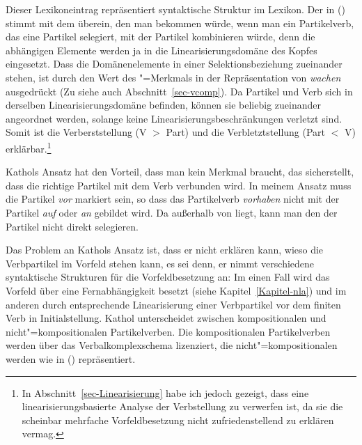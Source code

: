 \noindent
Dieser Lexikoneintrag repräsentiert syntaktische Struktur im Lexikon.
Der \domw in () stimmt mit dem \domw überein, den man bekommen würde,
wenn man ein Partikelverb, das eine Partikel selegiert, mit der Partikel kombinieren
würde, denn die abhängigen Elemente werden ja in die Linearisierungsdomäne
des Kopfes eingesetzt. Dass die Domänenelemente in einer Selektionsbeziehung zueinander stehen,
ist durch den Wert des \vcomp"=Merkmals in der Repräsentation von \emph{wachen} ausgedrückt
(Zu \vcomp siehe auch Abschnitt~\ref{sec-vcomp}).
Da Partikel und Verb sich in derselben Linearisierungsdomäne befinden, können sie beliebig
zueinander angeordnet werden, solange keine Linearisierungsbeschränkungen verletzt sind. Somit
ist die Verberststellung (V $>$ Part) und die Verbletztstellung (Part $<$ V) erklärbar.\footnote{
  In Abschnitt~\ref{sec-Linearisierung} habe ich jedoch gezeigt, dass eine linearisierungsbasierte
  Analyse der Verbstellung zu verwerfen ist, da sie die scheinbar mehrfache Vorfeldbesetzung nicht
  zufriedenstellend zu erklären vermag.%
}

Kathols Ansatz hat den Vorteil, dass man kein Merkmal braucht, das sicherstellt, dass
die richtige Partikel mit dem Verb verbunden wird. In meinem Ansatz muss die
Partikel \emph{vor} markiert sein, so dass das Partikelverb \emph{vorhaben} nicht mit der
Partikel \emph{auf} oder \emph{an} gebildet wird. Da \phon außerhalb von \synsem liegt,
kann man den \phonw der Partikel nicht direkt selegieren.

Das Problem an Kathols Ansatz ist, dass er nicht erklären kann, wieso die Verbpartikel
im Vorfeld stehen kann, es sei denn, er nimmt verschiedene syntaktische Strukturen für die
Vorfeldbesetzung an: Im einen Fall wird das Vorfeld über eine Fernabhängigkeit
besetzt (siehe Kapitel~\ref{Kapitel-nla}) und im anderen durch entsprechende Linearisierung einer
Verbpartikel vor dem finiten Verb in Initialstellung. Kathol unterscheidet zwischen kompositionalen
und nicht"=kompositionalen Partikelverben. Die kompositionalen Partikelverben werden über das Verbalkomplexschema
lizenziert, die nicht"=kompositionalen werden wie in () repräsentiert.
\largerpage[-1]


